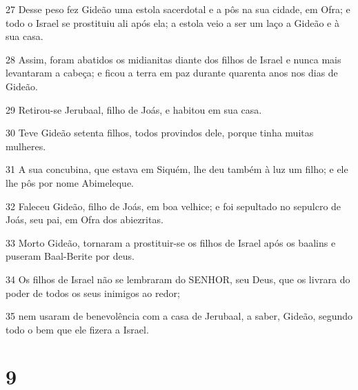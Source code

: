 \par 27 Desse peso fez Gideão uma estola sacerdotal e a pôs na sua cidade, em Ofra; e todo o Israel se prostituiu ali após ela; a estola veio a ser um laço a Gideão e à sua casa.
\par 28 Assim, foram abatidos os midianitas diante dos filhos de Israel e nunca mais levantaram a cabeça; e ficou a terra em paz durante quarenta anos nos dias de Gideão.
\par 29 Retirou-se Jerubaal, filho de Joás, e habitou em sua casa.
\par 30 Teve Gideão setenta filhos, todos provindos dele, porque tinha muitas mulheres.
\par 31 A sua concubina, que estava em Siquém, lhe deu também à luz um filho; e ele lhe pôs por nome Abimeleque.
\par 32 Faleceu Gideão, filho de Joás, em boa velhice; e foi sepultado no sepulcro de Joás, seu pai, em Ofra dos abiezritas.
\par 33 Morto Gideão, tornaram a prostituir-se os filhos de Israel após os baalins e puseram Baal-Berite por deus.
\par 34 Os filhos de Israel não se lembraram do SENHOR, seu Deus, que os livrara do poder de todos os seus inimigos ao redor;
\par 35 nem usaram de benevolência com a casa de Jerubaal, a saber, Gideão, segundo todo o bem que ele fizera a Israel.

\chapter{9}

